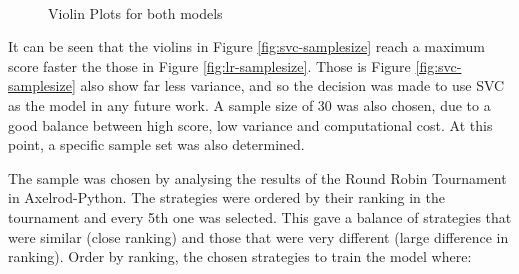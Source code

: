 \begin{figure}[htbp!]
    \centering
    \\
    \caption{Violin Plots for both models}
    \label{fig:score_4_sample_size}
\end{figure}

It can be seen that the violins in Figure \ref{fig:svc-samplesize} reach a maximum score faster the those in Figure \ref{fig:lr-samplesize}.
Those is Figure \ref{fig:svc-samplesize} also show far less variance, and so the decision was made to use SVC as the model in any future work.
A sample size of 30 was also chosen, due to a good balance between high score, low variance and computational cost.
At this point, a specific sample set was also determined.

The sample was chosen by analysing the results of the Round Robin Tournament in Axelrod-Python.
The strategies were ordered by their ranking in the tournament and every 5th one was selected.
This gave a balance of strategies that were similar (close ranking) and those that were very different (large difference in ranking).
Order by ranking, the chosen strategies to train the model where:

